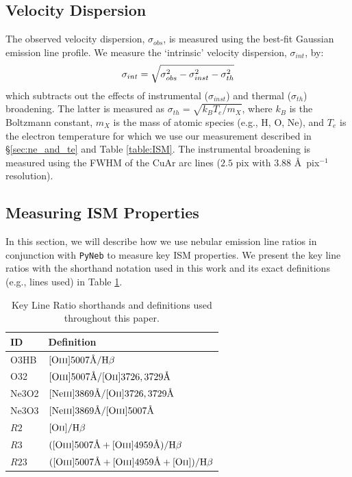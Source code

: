 \documentclass[twocolumn,tight,times,linenumbers]{aastex631}
\newcommand{\hbeta}{H$\beta$}
\newcommand{\oii}{[O{\sc ii}]}
\newcommand{\oiii}{[O{\sc iii}]}
\newcommand{\neiii}{[Ne{\sc iii}]}
\begin{document}
		\subsection{Velocity Dispersion}
		\label{sec:velocity_dispersion}
		
		The observed velocity dispersion, $\sigma_{obs}$, is measured using the best-fit Gaussian emission line profile. We measure the `intrinsic' velocity dispersion, $\sigma_{int}$, by:
		\begin{equation}
			\centering
			\sigma_{int} = \sqrt{ \sigma_{obs}^2 - \sigma_{inst}^2 - \sigma_{th}^2 }
		\end{equation}
		which subtracts out the effects of instrumental ($\sigma_{inst}$) and thermal ($\sigma_{th}$) broadening. The latter is measured as $\sigma_{th} = \sqrt{k_B T_e / m_X}$, where $k_B$ is the Boltzmann constant, $m_X$ is the mass of atomic species (e.g., H, O, Ne), and $T_e$ is the electron temperature for which we use our measurement described in \S\ref{sec:ne_and_te} and Table \ref{table:ISM}. The instrumental broadening is measured using the FWHM of the CuAr arc lines ($2.5$ pix with $3.88$ \AA~pix$^{-1}$ resolution).
		

	
		\subsection{Measuring ISM Properties}
		\label{sec:ism_methods}
		In this section, we will describe how we use nebular emission line ratios in conjunction with \verb|PyNeb| \citep{Luridiana2015} to measure key ISM properties. We present the key line ratios with the shorthand notation used in this work and its exact definitions (e.g., lines used) in Table \ref{table:ratio_defs}.
		
		\begin{table}
			\centering
			\caption{Key Line Ratio shorthands and definitions used throughout this paper.}
			\label{table:ratio_defs}
			{\renewcommand{\arraystretch}{1.1}
				\begin{tabular*}{\columnwidth}{@{\extracolsep{\fill}}ll}
					\hline
					ID & Definition \\
					\hline
					O3HB & $\textrm{\oiii}5007\textrm{\AA}/\textrm{\hbeta}$\\
					O32 & $ \textrm{\oiii}5007\textrm{\AA}/\textrm{\oii}3726,3729\textrm{\AA}$\\
					Ne3O2 & $ \textrm{\neiii}3869\textrm{\AA}/\textrm{\oii}3726,3729\textrm{\AA}$\\
					Ne3O3 & $ \textrm{\neiii}3869\textrm{\AA}/\textrm{\oiii}5007\textrm{\AA}$\\
					$R2$ & $\textrm{\oii}/\textrm{\hbeta}$\\
					$R3$ &$(\textrm{\oiii}5007\textrm{\AA} + \textrm{\oiii}4959\textrm{\AA})/\textrm{\hbeta}$\\
					$R23$ & $(\textrm{\oiii}5007\textrm{\AA} + \textrm{\oiii}4959\textrm{\AA} + \textrm{\oii})/\textrm{\hbeta}$\\
					\hline
				\end{tabular*}
			}
		\end{table}
		
\end{document}
